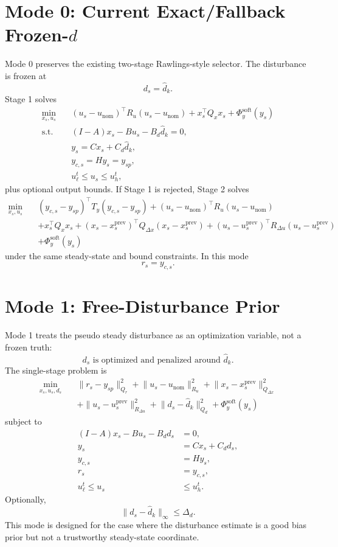 \documentclass[11pt]{article}
\begin{document}
\section{Mode 0: Current Exact/Fallback Frozen-$d$}
Mode 0 preserves the existing two-stage Rawlings-style selector. The disturbance is frozen at
\[
d_s = \hat d_k.
\]
Stage 1 solves
\begin{align}
\min_{x_s,u_s}\quad &
(u_s-u_{\text{nom}})^\top R_u (u_s-u_{\text{nom}})
 + x_s^\top Q_x x_s + \Phi_y^{\text{soft}}(y_s) \\
\text{s.t.}\quad &
(I-A)x_s - Bu_s - B_d\hat d_k = 0, \\
& y_s = Cx_s + C_d \hat d_k, \\
& y_{c,s} = H y_s = y_{sp}, \\
& u_{\ell}^{t} \le u_s \le u_{h}^{t},
\end{align}
plus optional output bounds. If Stage 1 is rejected, Stage 2 solves
\begin{align}
\min_{x_s,u_s}\quad &
(y_{c,s}-y_{sp})^\top T_y (y_{c,s}-y_{sp})
 + (u_s-u_{\text{nom}})^\top R_u (u_s-u_{\text{nom}}) \\
& + x_s^\top Q_x x_s
 + (x_s-x_s^{\text{prev}})^\top Q_{\Delta x}(x_s-x_s^{\text{prev}})
 + (u_s-u_s^{\text{prev}})^\top R_{\Delta u}(u_s-u_s^{\text{prev}}) \nonumber \\
& + \Phi_y^{\text{soft}}(y_s)
\end{align}
under the same steady-state and bound constraints. In this mode
\[
r_s = y_{c,s}.
\]

\section{Mode 1: Free-Disturbance Prior}
Mode 1 treats the pseudo steady disturbance as an optimization variable, not a frozen truth:
\[
d_s \text{ is optimized and penalized around } \hat d_k.
\]
The single-stage problem is
\begin{align}
\min_{x_s,u_s,d_s}\quad &
\|r_s-y_{sp}\|_{Q_r}^2
\!+\!\|u_s-u_{\text{nom}}\|_{R_u}^2
\!+\!\|x_s-x_s^{\text{prev}}\|_{Q_{\Delta x}}^2 \\
&+\|u_s-u_s^{\text{prev}}\|_{R_{\Delta u}}^2
\!+\!\|d_s-\hat d_k\|_{Q_d}^2
\!+\!\Phi_y^{\text{soft}}(y_s)
\end{align}
subject to
\begin{align}
(I-A)x_s - Bu_s - B_d d_s &= 0, \\
y_s &= Cx_s + C_d d_s, \\
y_{c,s} &= H y_s, \\
r_s &= y_{c,s}, \\
u_{\ell}^{t} \le u_s &\le u_{h}^{t}.
\end{align}
Optionally,
\[
\|d_s-\hat d_k\|_{\infty} \le \Delta_d.
\]
This mode is designed for the case where the disturbance estimate is a good bias prior but not a trustworthy steady-state coordinate.
\end{document}
